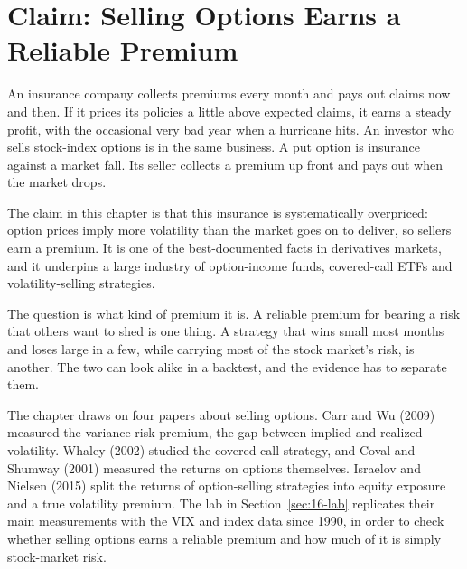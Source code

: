\makeatletter
{}
\makeatother

\chapter{Claim: Selling Options Earns a Reliable Premium}
\label{ch:16}

An insurance company collects premiums every month and pays out claims now and then. If it prices its policies a little above expected claims, it earns a steady profit, with the occasional very bad year when a hurricane hits. An investor who sells stock-index options is in the same business. A put option is insurance against a market fall. Its seller collects a premium up front and pays out when the market drops.

The claim in this chapter is that this insurance is systematically overpriced: option prices imply more volatility than the market goes on to deliver, so sellers earn a premium. It is one of the best-documented facts in derivatives markets, and it underpins a large industry of option-income funds, covered-call ETFs and volatility-selling strategies.

The question is what kind of premium it is. A reliable premium for bearing a risk that others want to shed is one thing. A strategy that wins small most months and loses large in a few, while carrying most of the stock market's risk, is another. The two can look alike in a backtest, and the evidence has to separate them.

The chapter draws on four papers about selling options. Carr and Wu (2009) measured the variance risk premium, the gap between implied and realized volatility. Whaley (2002) studied the covered-call strategy, and Coval and Shumway (2001) measured the returns on options themselves. Israelov and Nielsen (2015) split the returns of option-selling strategies into equity exposure and a true volatility premium. The lab in Section~\ref{sec:16-lab} replicates their main measurements with the VIX and index data since 1990, in order to check whether selling options earns a reliable premium and how much of it is simply stock-market risk.

